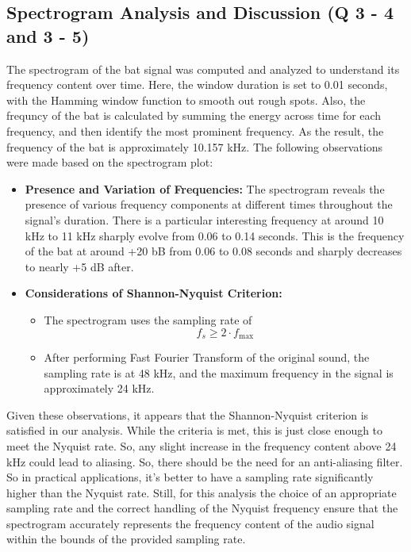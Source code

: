 \documentclass[twocolumn]{article}[ht]
\begin{document}
\subsection{Spectrogram Analysis and Discussion (Q 3 - 4 and 3 - 5)}
The spectrogram of the bat signal was computed and analyzed to understand its frequency content over time. Here, the window duration is set to 0.01 seconds, with the Hamming window function to smooth out rough spots. Also, the frequncy of the bat is calculated by summing the energy across time for each frequency, and then identify the most prominent frequency. As the result, the frequency of the bat is approximately 10.157 kHz. The following observations were made based on the spectrogram plot:
\begin{itemize}
    \item \textbf{Presence and Variation of Frequencies: } The spectrogram reveals the presence of various frequency components at different times throughout the signal's duration. There is a particular interesting frequency at around 10 kHz to 11 kHz sharply evolve from 0.06 to 0.14 seconds. This is the frequency of the bat at around +20 bB from 0.06 to 0.08 seconds and sharply decreases to nearly +5 dB after.
    \item \textbf{Considerations of Shannon-Nyquist Criterion: }
        \begin{itemize}
            \item The spectrogram uses the sampling rate of \[f_s \geq 2 \cdot f_{\text{max}}\]
            \item After performing Fast Fourier Transform of the original sound, the sampling rate is at 48 kHz, and the maximum frequency in the signal is approximately 24 kHz.
        \end{itemize}
\end{itemize}
Given these observations, it appears that the Shannon-Nyquist criterion is satisfied in our analysis. While the criteria is met, this is just close enough to meet the Nyquist rate. So, any slight increase in the frequency content above 24 kHz could lead to aliasing. So, there should be the need for an anti-aliasing filter. So in practical applications, it's better to have a sampling rate significantly higher than the Nyquist rate. Still, for this analysis the choice of an appropriate sampling rate and the correct handling of the Nyquist frequency ensure that the spectrogram accurately represents the frequency content of the audio signal within the bounds of the provided sampling rate.
\end{document}
